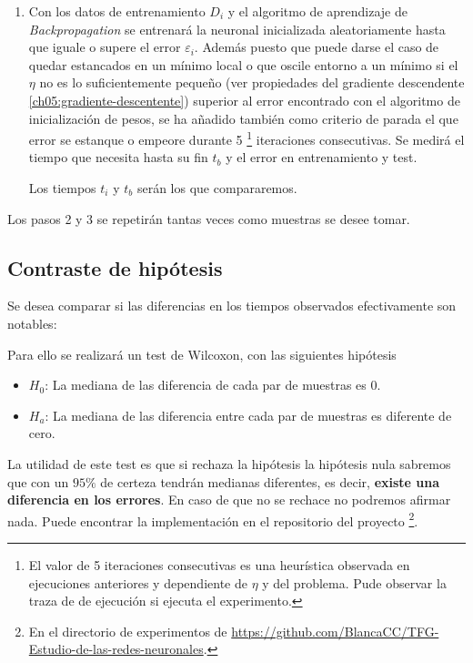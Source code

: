 \begin{enumerate}
\item Con los datos de entrenamiento $D_i$ y el algoritmo de aprendizaje de \textit{Backpropagation} se entrenará la neuronal inicializada aleatoriamente hasta que iguale o supere el error $\varepsilon_i$. Además puesto que puede darse el caso de quedar estancados en un mínimo local  o que oscile entorno a un mínimo si el $\eta$ no es lo suficientemente pequeño (ver propiedades del gradiente descendente \ref{ch05:gradiente-descentente})
superior al error encontrado con el algoritmo de inicialización de pesos, se ha añadido también como criterio de parada el que error se estanque o empeore durante 5 \footnote{El valor de 5 iteraciones consecutivas es una heurística observada en ejecuciones anteriores y dependiente de $\eta$ y del problema.
Pude observar la traza de de ejecución si ejecuta el experimento.} iteraciones consecutivas. 
Se medirá el tiempo que necesita hasta su fin $t_b$ y el error en entrenamiento y test. 

Los tiempos $t_i$ y $t_b$ serán los que compararemos. 
\end{enumerate}

Los pasos 2 y 3 se repetirán tantas veces como 
muestras se desee tomar. 

\subsection{Contraste de hipótesis}

Se desea comparar si las diferencias en los tiempos observados efectivamente son notables: 

Para ello se realizará un test de Wilcoxon, con las siguientes hipótesis

\begin{itemize}
    \item $H_0$: La mediana de las diferencia de cada par de muestras es $0$. 
    \item $H_a$: La mediana de las diferencia entre cada par de muestras es diferente de cero. 
\end{itemize}

La utilidad de este test es que si rechaza la hipótesis la hipótesis nula sabremos que con un $95 \%$ de certeza tendrán medianas diferentes, es decir, \textbf{existe una 
diferencia en los errores}. En caso de que no se rechace no podremos afirmar nada.
Puede encontrar la implementación en el repositorio del
 proyecto \footnote{En el directorio de experimentos 
 de \url{https://github.com/BlancaCC/TFG-Estudio-de-las-redes-neuronales}.}.

